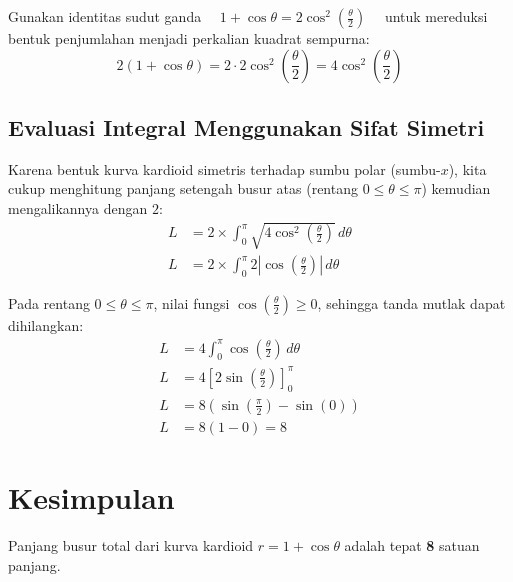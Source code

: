 \documentclass[11pt,a4paper]{article}
\begin{document}
Gunakan identitas sudut ganda $\quad 1 + \cos\theta = 2\cos^2\left(\frac{\theta}{2}\right) \quad$ untuk mereduksi bentuk penjumlahan menjadi perkalian kuadrat sempurna:
\begin{equation}
  2(1 + \cos\theta) = 2 \cdot 2\cos^2\left(\frac{\theta}{2}\right) = 4\cos^2\left(\frac{\theta}{2}\right)
\end{equation}

\subsection{Evaluasi Integral Menggunakan Sifat Simetri}
Karena bentuk kurva kardioid simetris terhadap sumbu polar (sumbu-$x$), kita cukup menghitung panjang setengah busur atas (rentang $0 \le \theta \le \pi$) kemudian mengalikannya dengan $2$:
\begin{align*}
  L &= 2 \times \int_{0}^{\pi} \sqrt{4\cos^2\left(\frac{\theta}{2}\right)} \, d\theta \\
  L &= 2 \times \int_{0}^{\pi} 2\left|\cos\left(\frac{\theta}{2}\right)\right| \, d\theta
\end{align*}

Pada rentang $0 \le \theta \le \pi$, nilai fungsi $\cos\left(\frac{\theta}{2}\right) \ge 0$, sehingga tanda mutlak dapat dihilangkan:
\begin{align*}
  L &= 4 \int_{0}^{\pi} \cos\left(\frac{\theta}{2}\right) \, d\theta \\
  L &= 4 \left[ 2\sin\left(\frac{\theta}{2}\right) \right]_{0}^{\pi} \\
  L &= 8 \left( \sin\left(\frac{\pi}{2}\right) - \sin(0) \right) \\
  L &= 8 (1 - 0) = 8
\end{align*}

\section{Kesimpulan}
Panjang busur total dari kurva kardioid $r = 1 + \cos\theta$ adalah tepat \textbf{8} satuan panjang.
\end{document}

